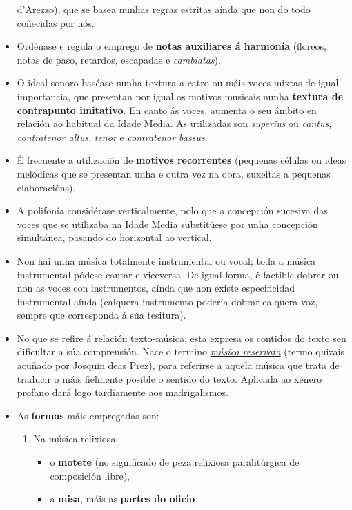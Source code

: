 \documentclass[
]{article}
\begin{document}
\begin{itemize}
  d'Arezzo), que se basea nunhas regras estritas aínda que non do todo
  coñecidas por nós.
\item
  Ordénase e regula o emprego de \textbf{notas auxiliares á harmonía}
  (floreos, notas de paso, retardos, escapadas e \emph{cambiatas}).
\item
  O ideal sonoro baséase nunha textura a catro ou máis voces mixtas de
  igual importancia, que presentan por igual os motivos musicais nunha
  \textbf{textura de contrapunto imitativo}. En canto ás voces, aumenta
  o seu ámbito en relación ao habitual da Idade Media. As utilizadas son
  \emph{superius} ou \emph{cantus}, \emph{contratenor altus},
  \emph{tenor} e \emph{contratenor bassus}.
\item
  É frecuente a utilización de \textbf{motivos recorrentes} (pequenas
  células ou ideas melódicas que se presentan unha e outra vez na obra,
  suxeitas a pequenas elaboracións).
\item
  A polifonía considérase verticalmente, polo que a concepción sucesiva
  das voces que se utilizaba na Idade Media substitúese por unha
  concepción simultánea, pasando do horizontal ao vertical.
\item
  Non hai unha música totalmente instrumental ou vocal; toda a música
  instrumental pódese cantar e viceversa. De igual forma, é factible
  dobrar ou non as voces con instrumentos, aínda que non existe
  especificidad instrumental aínda (calquera instrumento podería dobrar
  calquera voz, sempre que corresponda á súa tesitura).
\item
  No que se refire á relación texto-música, esta expresa os contidos do
  texto sen dificultar a súa comprensión. Nace o termino
  \href{http://es.wikipedia.org/wiki/Musica_reservata}{\emph{música
  reservata}} (termo quizais acuñado por Josquin deas Prez), para
  referirse a aquela música que trata de traducir o máis fielmente
  posible o sentido do texto. Aplicada ao xénero profano dará logo
  tardíamente aos madrigalismos.
\item
  As \textbf{formas} máis empregadas son:

  \begin{enumerate}
  \def\labelenumi{\arabic{enumi}.}
  \item
    Na música relixiosa:

    \begin{itemize}
    \item
      o \textbf{motete} (no significado de peza relixiosa paralitúrgica
      de composición libre),
    \item
      a \textbf{misa}, máis as \textbf{partes do oficio}.


\end{itemize}
\end{enumerate}
\end{itemize}
\end{document}
